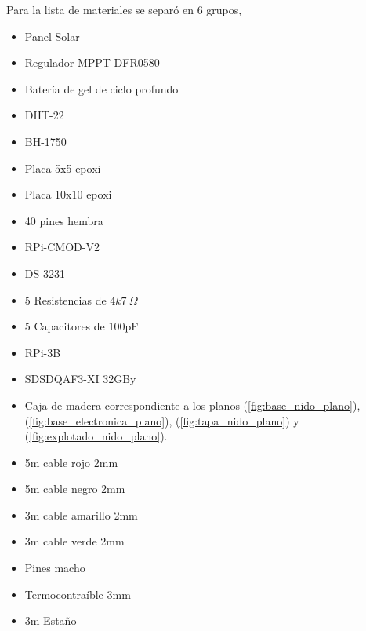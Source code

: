 Para la lista de materiales se separó en 6 grupos, 
\begin{itemize}

\item Panel Solar \TBD
\item Regulador MPPT DFR0580
\item Bater\'ia de gel de ciclo profundo \TBD
\end{itemize}
\begin{itemize}
\item DHT-22 
\item BH-1750
\item Placa 5x5 epoxi
\item Placa 10x10 epoxi
\item 40 pines hembra
\item RPi-CMOD-V2
\item DS-3231
\item 5 Resistencias de $4k7 \ \Omega$ 
\item 5 Capacitores de 100pF
\end{itemize}
\begin{itemize}
\item RPi-3B
\item SDSDQAF3-XI 32GBy
\end{itemize}


\begin{itemize}

\item Caja de madera correspondiente a los planos (\ref{fig:base_nido_plano}), (\ref{fig:base_electronica_plano}), (\ref{fig:tapa_nido_plano}) y (\ref{fig:explotado_nido_plano}).


\end{itemize}
\begin{itemize}
\item 5m cable rojo 2mm
\item 5m cable negro 2mm
\item 3m cable amarillo 2mm
\item 3m cable verde 2mm
\item Pines macho
\item Termocontra\'ible 3mm
\item 3m Estaño

\end{itemize}









